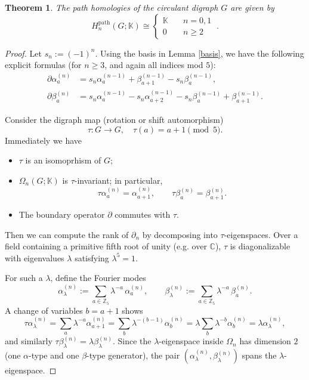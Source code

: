 \documentclass[11pt]{amsart}
\newcommand{\Z}{\mathbb Z}
\theoremstyle{plain}
\newtheorem{theorem}{Theorem}[section]
\theoremstyle{definition}
\numberwithin{equation}{section}
\begin{document}
\begin{theorem}\label{thm1} The path homologies of the circulant digraph $G$ are given by
\[H_n^{\mathrm{path}}(G;\mathbb{K})\cong\begin{cases}
\mathbb{K} &\quad n=0,1\\
0 &\quad n\geq2
\end{cases}~.\]
\end{theorem}

\begin{proof}

 Let $s_n:=(-1)^n$. Using the basis in Lemma \ref{basis}, we have the following explicit formulas
(for $n\ge 3$, and again all indices mod $5$):
\begin{equation}\label{eqrec}
\begin{aligned}
 \partial \alpha_a^{(n)}&=s_n\alpha_a^{(n-1)}+\beta_{a+1}^{(n-1)}- s_n\beta_a^{(n-1)},\\
 \partial \beta_a^{(n)}&=s_n\alpha_a^{(n-1)}-s_n\alpha_{a+2}^{(n-1)}- s_n\beta_a^{(n-1)}+\beta_{a+1}^{(n-1)}.
\end{aligned}
\end{equation}
\vskip 0.2cm

Consider the digraph map (rotation or shift automorphism)
$$\tau:G\rightarrow G,\quad \tau(a)=a+1\pmod5.$$
Immediately we have
\begin{itemize}
\setlength\itemsep{0pt}
\item $\tau$ is an isomoprhism of $G$;
\item $\Omega_n(G;\mathbb{K})$ is $\tau$-invariant; in particular,
\[\tau\alpha_a^{(n)}=\alpha_{a+1}^{(n)},\qquad \tau\beta_a^{(n)}=\beta_{a+1}^{(n)}.\]
\item The boundary operator $\partial$ commutes with $\tau$.
\end{itemize}

Then we can compute the rank of $\partial_n$ by decomposing into $\tau$-eigenspaces. Over a field containing a primitive fifth root of unity (e.g. over $\mathbb{C}$), $\tau$ is diagonalizable with eigenvalues $\lambda$ satisfying $\lambda^5=1$. 


For such a $\lambda$, define the Fourier modes
\[
\alpha^{(n)}_\lambda:=\sum_{a\in\Z_5}\lambda^{-a}\,\alpha^{(n)}_a,\qquad
\beta^{(n)}_\lambda:=\sum_{a\in\Z_5}\lambda^{-a}\,\beta^{(n)}_a.
\]
A change of variables $b=a+1$ shows
\[
\tau \alpha^{(n)}_\lambda=\sum_a \lambda^{-a}\alpha^{(n)}_{a+1}
=\sum_b \lambda^{-(b-1)}\alpha^{(n)}_b
=\lambda\sum_b \lambda^{-b}\alpha^{(n)}_b
=\lambda \alpha^{(n)}_\lambda,
\]
and similarly $\tau \beta^{(n)}_\lambda=\lambda \beta^{(n)}_\lambda$.  Since the $\lambda$-eigenspace inside $\Omega_n$ has
dimension $2$ (one $\alpha$-type and one $\beta$-type generator), the pair $(\alpha^{(n)}_\lambda,\beta^{(n)}_\lambda)$ spans the $\lambda$-eigenspace.


\end{proof}
\end{document}
